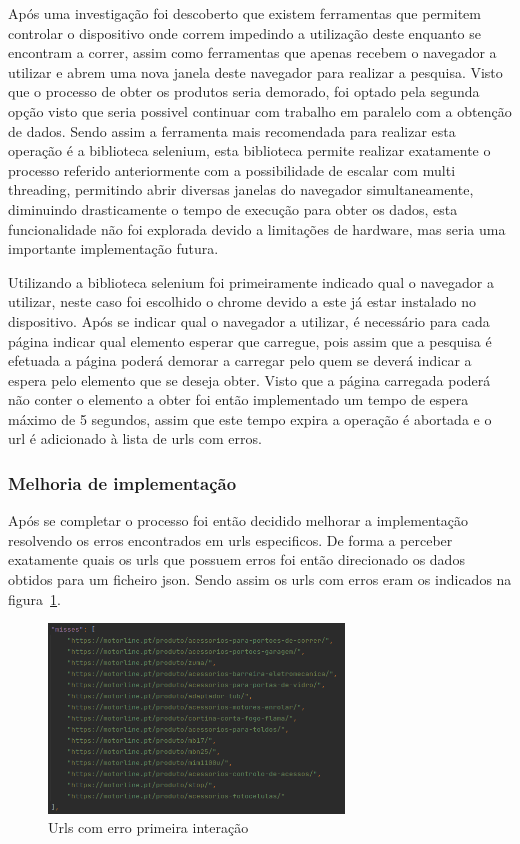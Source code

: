 Após uma investigação foi descoberto que existem ferramentas que permitem controlar o dispositivo onde correm impedindo a utilização deste enquanto se 
encontram a correr, assim como ferramentas que apenas recebem o navegador a utilizar e abrem uma nova janela deste navegador para realizar a pesquisa.
Visto que o processo de obter os produtos seria demorado, foi optado pela segunda opção visto que seria possivel continuar com trabalho em paralelo com a
obtenção de dados. Sendo assim a ferramenta mais recomendada para realizar esta operação é a biblioteca selenium, esta biblioteca permite realizar exatamente
o processo referido anteriormente com a possibilidade de escalar com multi threading, permitindo abrir diversas janelas do navegador simultaneamente,
diminuindo drasticamente o tempo de execução para obter os dados, esta funcionalidade não foi explorada devido a limitações de hardware, 
mas seria uma importante implementação futura.

Utilizando a biblioteca selenium foi primeiramente indicado qual o navegador a utilizar, neste caso foi escolhido o chrome devido a este já estar instalado
no dispositivo. Após se indicar qual o navegador a utilizar, é necessário para cada página indicar qual elemento esperar que carregue, pois assim que a pesquisa
é efetuada a página poderá demorar a carregar pelo quem se deverá indicar a espera pelo elemento que se deseja obter. Visto que a página carregada poderá não
conter o elemento a obter foi então implementado um tempo de espera máximo de 5 segundos, assim que este tempo expira a operação é abortada e o url é adicionado
à lista de urls com erros.

\newpage


\subsubsection{Melhoria de implementação}

Após se completar o processo foi então decidido melhorar a implementação resolvendo os erros encontrados em urls especificos. De forma a perceber exatamente quais os urls
que possuem erros foi então direcionado os dados obtidos para um ficheiro json. Sendo assim os urls com erros eram os indicados na figura~\ref{fig:57}.

\begin{figure}[htb]
    \centering
    
    \includegraphics[width=0.7\textwidth]{images/implementacao/scraper/urls_erro_iteracao_1.png}
    \caption{Urls com erro primeira interação}
    \label{fig:57}
\end{figure}

